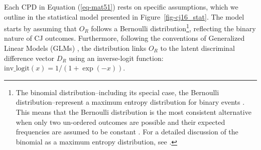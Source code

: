 \documentclass[
  authoryear,
  review,
  1p]{elsarticle}
\begin{document}
Each CPD in Equation (\ref{eq-mat51}) rests on specific assumptions,
which we outline in the statistical model presented in
Figure~\ref{fig-cj16_stat}. The model starts by assuming that \(O_{R}\)
follows a Bernoulli distribution\footnote{The binomial
  distribution--including its special case, the Bernoulli
  distribution--represent a maximum entropy distribution for binary
  events \citep[p.~34]{McElreath_2020}. This means that the Bernoulli
  distribution is the most consistent alternative when only two
  un-ordered outcomes are possible and their expected frequencies are
  assumed to be constant \citep[p.~310]{McElreath_2020}. For a detailed
  discussion of the binomial as a maximum entropy distribution, see
  \citet[sec.~10.1.2]{McElreath_2020}.}, reflecting the binary nature of
CJ outcomes. Furthermore, following the conventions of Generalized
Linear Models (GLMs)
\citep{Nelder_et_al_1983, Nelder_et_al_1996, Agresti_2015}, the
distribution links \(O_{R}\) to the latent discriminal difference vector
\(D_{R}\) using an inverse-logit function:
\(\text{inv\_logit}(x) = 1/(1 + \exp(-x))\).
\end{document}
